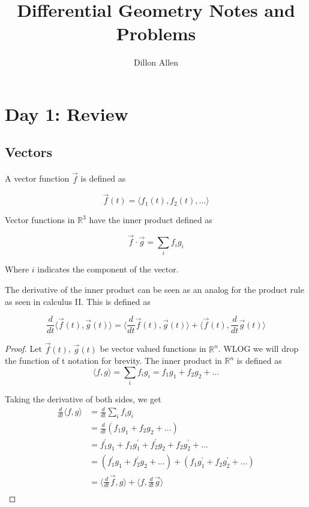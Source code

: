 \documentclass[12pt]{amsart}
\title{Differential Geometry Notes and Problems}
\author{Dillon Allen}
\newcommand{\innerProd}[2]{\langle #1,#2 \rangle}
\begin{document}
\maketitle
\tableofcontents

\section{Day 1: Review}
\subsection{Vectors}

A vector function $\vec{f}$ is defined as 

\[
	\vec{f}\left(t\right) = \langle f_1\left(t\right), f_2\left(t\right), \dots \rangle
\]

Vector functions in $\mathbb{R}^3$ have the inner product defined as 

\[
	\vec{f} \cdot \vec{g} = \sum_{i} f_i g_i
\]

Where $i$ indicates the component of the vector.

The derivative of the inner product can be seen as an analog for the product rule as seen in calculus II. This is defined as

\[
	\frac{d}{dt} \langle \vec{f} \left(t\right) , \vec{g} \left( t \right) \rangle = \langle \frac{d}{dt} \vec{f}\left(t\right), \vec{g}\left(t\right) \rangle + \langle \vec{f}\left(t\right), \frac{d}{dt} \vec{g}\left(t\right) \rangle
\]

\begin{proof}

	Let $\vec{f}\left(t\right)$, $\vec{g}\left(t\right)$ be vector valued functions in $\mathbb{R}^n$. WLOG we will drop the function of t notation for brevity. The inner product in 
	$\mathbb{R}^n$ is defined as 
	\begin{equation*}
		\innerProd{f}{g} = \sum_{i} f_i g_i = f_1g_1 + f_2 g_2 + \ldots
	\end{equation*}
	
	Taking the derivative of both sides, we get
	\begin{equation*}
		\begin{aligned}
			\frac{d}{dt} \innerProd{f}{g} &= \frac{d}{dt} \sum_i f_i g_i \\
										  &= \frac{d}{dt} \left(f_1 g_1 + f_2 g_2 + \ldots \right) \\
										  &= f^{'}_1 g_1 + f_1 g^{'}_1 + f^{'}_2 g_2 + f_2 g^{'}_2 + \dots \\
										  &= \left( f^{'}_1 g_1 + f^{'}_2 g_2 + \ldots \right) + \left(f_1 g^{'}_1 + f_2 g^{'}_2 + \ldots \right) \\
										  &= \innerProd{\frac{d}{dt}\vec{f}}{g} + \innerProd{f}{\frac{d}{dt}\vec{g}} \\
		\end{aligned}
	\end{equation*}
	
	
\end{proof}
\end{document}
